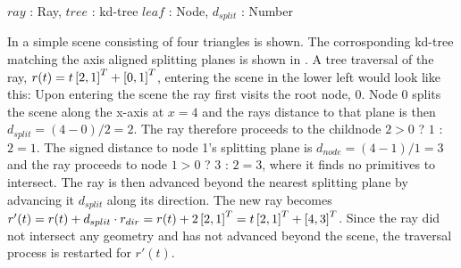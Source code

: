 \begin{algorithm}
  \caption{A basic kd-tree traversal algorithm}
  \label{alg:generalTraversal}
  \begin{algorithmic}
              {$ray$ : Ray, $tree$ : kd-tree}
              {$leaf$ : Node, $d_{split}$ : Number}{
                  \ELSE
                  \ENDIF
                \ENDWHILE
              }
  \end{algorithmic}
\end{algorithm}

In  a simple scene consisting of four triangles is
shown. The corrosponding kd-tree matching the axis aligned splitting planes is
shown in . A tree traversal of the ray, $r(t) = t
\left[2, 1 \right]^T + \left[0, 1 \right]^T$, entering the scene in the lower left would
look like this: Upon entering the scene the ray first visits the root node,
0. Node 0 splits the scene along the x-axis at $x=4$ and the rays distance to
that plane is then $d_{split} = (4 - 0) / 2 = 2$. The ray therefore proceeds to
the childnode $2 > 0$ ? $1$ : $2 = 1$. The signed distance to node 1's splitting
plane is $d_{node} = (4 - 1) / 1 = 3$ and the ray proceeds to node $1 > 0$ ?
$3$ : $2 = 3$, where it finds no primitives to intersect. The ray is then
advanced beyond the nearest splitting plane by advancing it $d_{split}$ along
its direction. The new ray becomes $r'(t) = r(t) + d_{split} \cdot r_{dir} =
r(t) + 2 \left[2, 1 \right]^T = t \left[2, 1 \right]^T + \left[4, 3 \right]^T$. Since the ray did
not intersect any geometry and has not advanced beyond the scene, the traversal
process is restarted for $r'(t)$.


